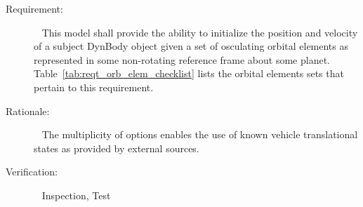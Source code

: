 \label{reqt:DynBodyInit:orbelem}
\begin{description}
  \item[Requirement:]\ \newline
    This model shall provide the ability to initialize
    the position and velocity of a subject DynBody object
    given a set of osculating orbital elements as represented in
    some non-rotating reference frame about some planet.
   Table~\ref{tab:reqt_orb_elem_checklist}
    lists the orbital elements sets
    that pertain to this requirement.
  \item[Rationale:]\ \newline
    The multiplicity of options enables the use of
    known vehicle translational states as provided by external sources.
  \item[Verification:]\ \newline
    Inspection, Test
\end{description}

